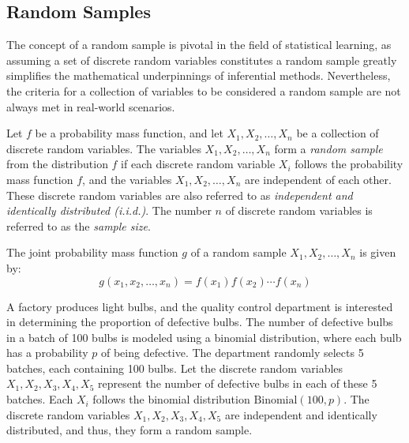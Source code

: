 
\subsection{Random Samples}

The concept of a random sample is pivotal in the field of statistical learning, as assuming a set of discrete random variables constitutes a random sample greatly simplifies the mathematical underpinnings of inferential methods. Nevertheless, the criteria for a collection of variables to be considered a random sample are not always met in real-world scenarios.

\begin{definition}
Let \( f \) be a probability mass function, and let \( X_1, X_2, \ldots, X_n \) be a collection of discrete random variables. The variables \( X_1, X_2, \ldots, X_n \) form a \emph{random sample} from the distribution \( f \) if each discrete random variable \( X_i \) follows the probability mass function \( f \), and the variables \( X_1, X_2, \ldots, X_n \) are independent of each other. These discrete random variables are also referred to as \emph{independent and identically distributed (i.i.d.)}. The number \( n \) of discrete random variables is referred to as the \emph{sample size}.
\end{definition}

The joint probability mass function \( g \) of a random sample \( X_1, X_2, \ldots, X_n \) is given by:
\[
g\left( x_1, x_2, \ldots, x_n \right) = f\left( x_1 \right) f\left( x_2 \right) \cdots f\left( x_n \right)
\]

\begin{example}
A factory produces light bulbs, and the quality control department is interested in determining the proportion of defective bulbs. The number of defective bulbs in a batch of 100 bulbs is modeled using a binomial distribution, where each bulb has a probability \( p \) of being defective. The department randomly selects 5 batches, each containing 100 bulbs. Let the discrete random variables \( X_1, X_2, X_3, X_4, X_5 \) represent the number of defective bulbs in each of these 5 batches. Each \( X_i \) follows the binomial distribution \( \text{Binomial}(100, p) \). The discrete random variables \( X_1, X_2, X_3, X_4, X_5 \) are independent and identically distributed, and thus, they form a random sample.
\end{example}

